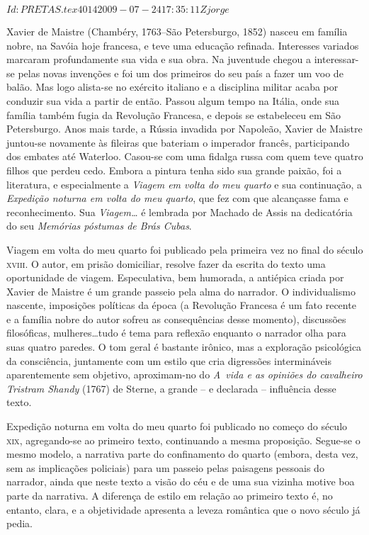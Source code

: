 \SVN $Id: PRETAS.tex 4014 2009-07-24 17:35:11Z jorge $
\begin{resumopage}

\item[Xavier de Maistre] (Chambéry, 1763--São Petersburgo, 1852)
nasceu em família nobre, na Savóia hoje francesa, e teve uma educação
refinada. Interesses variados marcaram profundamente sua vida e
sua obra. Na juventude chegou a interessar-se pelas novas invenções e
foi um dos primeiros do seu país a fazer um voo de balão. Mas logo
alista-se no exército italiano e a disciplina militar acaba por
conduzir sua vida a partir de então. Passou algum tempo na Itália, onde
sua família também fugia da Revolução Francesa, e depois se estabeleceu
em São Petersburgo. Anos mais tarde, a Rússia invadida por Napoleão,
Xavier de Maistre juntou-se novamente às fileiras que bateriam o
imperador francês, participando dos embates até Waterloo. Casou-se com
uma fidalga russa com quem teve quatro filhos que perdeu cedo. Embora a
pintura tenha sido sua grande paixão, foi a literatura, e especialmente
a \textit{Viagem em volta do meu quarto} e sua continuação, a
\textit{Expedição noturna em volta do meu quarto}, que fez com que
alcançasse fama e reconhecimento. Sua \textit{Viagem\ldots} é lembrada por
Machado de Assis na dedicatória do seu \textit{Memórias póstumas de Brás Cubas}.   

\item[Viagem em volta do meu quarto] foi publicado pela primeira vez
no final do século \textsc{xviii}. O autor, em prisão domiciliar, resolve fazer
da escrita do texto uma oportunidade de viagem. Especulativa, bem
humorada, a antiépica criada por Xavier de Maistre é um grande passeio
pela alma do narrador. O individualismo nascente, imposições políticas
da época (a Revolução Francesa é um fato recente e a família nobre do
autor sofreu as consequências desse momento), discussões filosóficas,
mulheres\ldots tudo é tema para reflexão enquanto o narrador olha para
suas quatro paredes. O tom geral é bastante irônico, mas a exploração
psicológica da consciência, juntamente com um estilo que cria
digressões intermináveis aparentemente sem objetivo, aproximam-no do
\textit{\mbox{A vida} e as opiniões do cavalheiro Tristram Shandy} (1767) de
Sterne, a grande -- e declarada -- influência desse texto.  

\item[Expedição noturna em volta do meu quarto] foi publicado no
começo do século \textsc{xix}, agregando-se ao primeiro texto, continuando a
mesma proposição. Segue-se o mesmo modelo, a narrativa parte do
confinamento do quarto (embora, desta vez, sem as implicações
policiais) para um passeio pelas paisagens pessoais do narrador, ainda
que neste texto a visão do céu e de uma sua vizinha motive boa parte
da narrativa. A diferença de estilo em relação ao primeiro texto é, no
entanto, clara, e a objetividade apresenta a leveza romântica que o
novo século já pedia. 


\end{resumopage}
